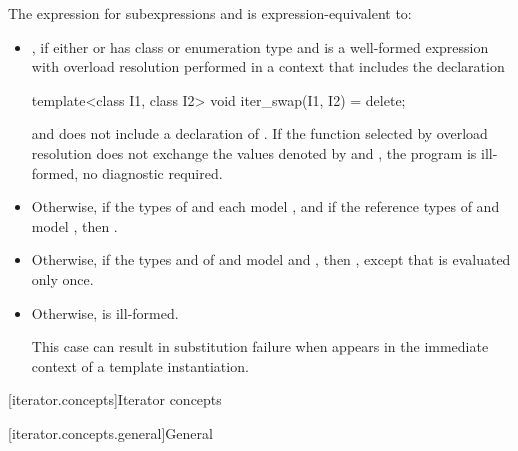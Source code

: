 \pnum
The expression  for subexpressions
 and  is expression-equivalent to:
\begin{itemize}
\item {}, if either
 or  has class or enumeration type and
 is a well-formed expression
with overload resolution performed in a context that includes the declaration
\begin{codeblock}
template<class I1, class I2>
  void iter_swap(I1, I2) = delete;
\end{codeblock}
and does not include a declaration of .
If the function selected by overload resolution does not exchange the values
denoted by  and ,
the program is ill-formed, no diagnostic required.

\item Otherwise, if the types of  and  each model
, and if the reference types of  and 
model ,
then .

\item Otherwise, if the types  and  of  and
 model  and
, then
,
except that  is evaluated only once.

\item Otherwise,  is ill-formed.
\begin{note}
This case can result in substitution failure when 
appears in the immediate context of a template instantiation.
\end{note}
\end{itemize}

[iterator.concepts]{Iterator concepts}

[iterator.concepts.general]{General}

